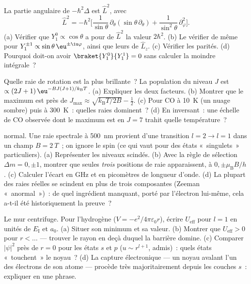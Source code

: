 \begin{exercise}[$\star\star$]\label{exo:b3:quantum-angular-momentum:5}
La partie angulaire de $-\hbar^2\Delta$ est $\hat L^2$, avec
\[
\hat L^2 = -\hbar^2\Big[\frac{1}{\sin\theta}\,\partial_\theta
(\sin\theta\,\partial_\theta) +
\frac{1}{\sin^2\theta}\,\partial_\varphi^2\Big] .
\]
(a) Vérifier que $Y_1^0 \propto \cos\theta$ a pour  de
$\hat L^2$ la valeur $2\hbar^2$. (b) Le vérifier de même pour
$Y_1^{\pm1} \propto \sin\theta\,
\eu^{\pm\iu\varphi}$, ainsi que leurs  de $\hat L_z$.
(c) Vérifier les parités. (d) Pourquoi doit-on avoir
$\braket{Y_1^0}{Y_1^1} = 0$ sans calculer la moindre intégrale~?
\end{exercise}

\begin{exercise}[$\star\star$]\label{exo:b3:quantum-angular-momentum:6}
Quelle raie de rotation est la plus brillante~? La population du
niveau $J$ est $\propto (2J+1)\,\eu^{-BJ(J+1)/k_{\text{B}}T}$. (a)
Expliquer les deux facteurs. (b) Montrer que le maximum est près de $J_{\max} \approx
\sqrt{k_{\text{B}}T/2B} - \tfrac12$. (c) Pour CO à \qty{10}{K}
(un nuage sombre) puis à \qty{300}{K}~: quelles raies dominent~? (d)
En inversant~: une échelle de CO observée dont le maximum est en
$J = 7$ trahit quelle température~?
\end{exercise}

\begin{exercise}[$\star\star$]\label{exo:b3:quantum-angular-momentum:7}
 normal. Une raie spectrale à \qty{500}{nm} provient d'une
transition $l = 2 \to l = 1$ dans un champ $B = \qty{2}{T}$~; on
ignore le spin (ce qui vaut pour des états «~singulets~» particuliers).
(a) Représenter les niveaux scindés. (b) Avec la règle de sélection
$\Delta m = 0, \pm1$, montrer que seules \emph{trois} positions de
raie apparaissent, à $0, \pm\mu_{\text{B}}B/h$. (c) Calculer l'écart en
GHz et en picomètres de longueur d'onde. (d) La plupart des raies
réelles se scindent en plus de trois composantes (Zeeman
«~anormal~»)~: de quel ingrédient manquant, porté par l'électron
lui-même, cela a-t-il été historiquement la preuve~?
\end{exercise}

\begin{exercise}[$\star\star$]\label{exo:b3:quantum-angular-momentum:8}
Le mur centrifuge. Pour l'hydrogène ($V = -e^2/4\pi\varepsilon_0r$),
écrire $U_{\text{eff}}$ pour $l = 1$ en unités de $E_{\text{I}}$ et
$a_0$. (a) Situer son minimum et sa valeur. (b) Montrer que $U_{\text{eff}} >
0$ pour $r < \dots$ --- trouver le rayon en deçà duquel la barrière
domine. (c) Comparer $|\psi|^2$ près de $r = 0$ pour les états $s$ et
$p$ ($u \sim r^{l+1}$, admis)~: quels états «~touchent~» le noyau~? (d)
La capture électronique --- un noyau avalant l'un des électrons de son
atome --- procède très majoritairement depuis les couches $s$~:
expliquer en une phrase.
\end{exercise}

